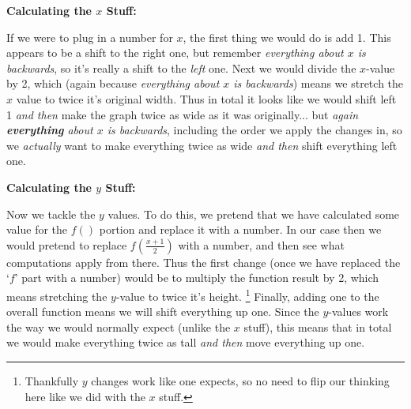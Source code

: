 \documentclass{ximera}
\begin{document}
    \textbf{Calculating the $x$ Stuff:}
    
    If we were to plug in a number for $x$, the first thing we would do is add 1. This appears to be a shift to the right one, but remember \textit{everything about $x$ is backwards}, so it's really a shift to the \textit{left} one. Next we would divide the $x$-value by 2, which (again because \textit{everything about $x$ is backwards}) means we stretch the $x$ value to twice it's original width. Thus in total it looks like we would shift left 1 \textit{and then} make the graph twice as wide as it was originally... but \textit{again} \textit{\textbf{everything} about $x$ is backwards}, including the order we apply the changes in, so we \textit{actually} want to make everything twice as wide \textit{and then} shift everything left one.
    
    \textbf{Calculating the $y$ Stuff:}
    
    Now we tackle the $y$ values. To do this, we pretend that we have calculated some value for the $f( )$ portion and replace it with a number. In our case then we would pretend to replace $f\left(\frac{x+1}{2}\right)$ with a number, and then see what computations apply from there. Thus the first change (once we have replaced the `$f$' part with a number) would be to multiply the function result by 2, which means stretching the $y$-value to twice it's height.%
    \footnote{%
        Thankfully $y$ changes work like one expects, so no need to flip our thinking here like we did with the $x$ stuff.%
        }
    Finally, adding one to the overall function means we will shift everything up one. Since the $y$-values work the way we would normally expect (unlike the $x$ stuff), this means that in total we would make everything twice as tall \textit{and then} move everything up one.
    
\end{document}
